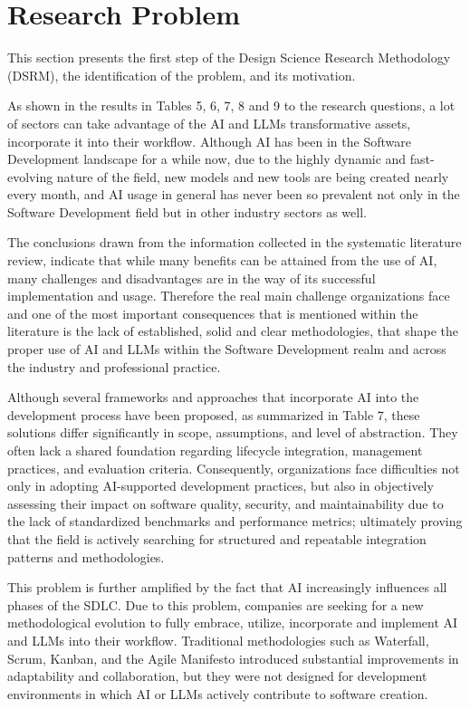 \section{Research Problem}

This section presents the first step of the Design Science Research Methodology (DSRM), the identification of the problem, and its motivation. 

As shown in the results in Tables 5, 6, 7, 8 and 9 to the research questions, a lot of sectors can take advantage of the AI and LLMs transformative assets, incorporate it into their workflow. Although AI has been in the Software Development landscape for a while now, due to the highly dynamic and fast-evolving nature of the field, new models and new tools are being created nearly every month, and AI usage in general has never been so prevalent not only in the Software Development field but in other industry sectors as well. 

The conclusions drawn from the information collected in the systematic literature review, indicate that while many benefits can be attained from the use of AI, many challenges and disadvantages are in the way of its successful implementation and usage. Therefore the real main challenge organizations face and one of the most important consequences that is mentioned within the literature is the lack of established, solid and clear methodologies, that shape the proper use of AI and LLMs within the Software Development realm and across the industry and professional practice. \cite{Banh:2025cf, Farhanna:2025eu, Hemmat:2025rd, Gao:2025cc}

Although several frameworks and approaches that incorporate AI into the development process have been proposed, as summarized in Table 7, these solutions differ significantly in scope, assumptions, and level of abstraction. They often lack a shared foundation regarding lifecycle integration, management practices, and evaluation criteria. Consequently, organizations face difficulties not only in adopting AI-supported development practices, but also in objectively assessing their impact on software quality, security, and maintainability due to the lack of standardized benchmarks and performance metrics; ultimately proving that the field is actively searching for structured and repeatable integration patterns and methodologies. \cite{Ahmed:2025ai}

This problem is further amplified by the fact that AI increasingly influences all phases of the SDLC. Due to this problem, companies are seeking for a new methodological evolution to fully embrace, utilize, incorporate and implement AI and LLMs into their workflow. Traditional methodologies such as Waterfall, Scrum, Kanban, and the Agile Manifesto introduced substantial improvements in adaptability and collaboration, but they were not designed for development environments in which AI or LLMs actively contribute to software creation. \cite{Zhang:2025ea}

